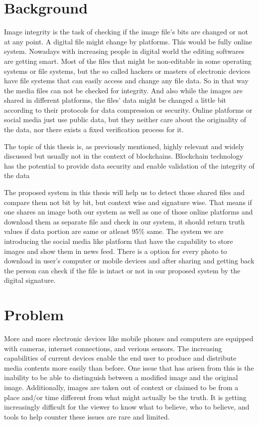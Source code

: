 \section{Background}
\label{sec:background}
Image integrity is the task of checking if the image file's bits are changed or not at any point. A digital file might change by platforms. This would be fully online system. Nowadays with increasing people in digital world the editing softwares are getting smart. Most of the files that might be non-editable in some operating systems or file systems, but the so called hackers or masters of electronic devices have file systems that can easily access and change any file data. So in that way the media files can not be checked for integrity. And also while the images are shared in different platforms, the files' data might be changed a little bit according to their protocols for data compression or security. Online platforms or social media just use public data, but they neither care about the originality of the data, nor there exists a fixed verification process for it.

The topic of this thesis is, as previously mentioned, highly relevant and widely discussed but usually not in the context of blockchains. Blockchain technology has the potential to provide data security and enable validation of the integrity of the data

The proposed system in this thesis will help us to detect those shared files and compare them not bit by bit, but context wise and signature wise. That means if one shares an image both our system as well as one of those online platforms and download them as separate file and check in our system, it should return truth values if data portion are same or atleast 95\% same. The system we are introducing the social media like platform that have the capability to store images and show them in news feed. There is a option for every photo to download in user's computer or mobile devices and after sharing and getting back the person can check if the file is intact or not in our proposed system by the digital signature.

\section{Problem}
\label{sec:problem}
More and more electronic devices like mobile phones and computers are equipped with cameras, internet connections, and verious sensors. The increasing capabilities of current devices enable the end user to produce and distribute media contents more easily than before. One issue that has arisen from this is the inability to be able to distinguish between a modified image and the original image. Additionally, images are taken out of context or claimed to be from a place and/or time different from what might actually be the truth. It is getting increasingly difficult for the viewer to know what to believe, who to believe, and tools to help counter these issues are rare and limited.

